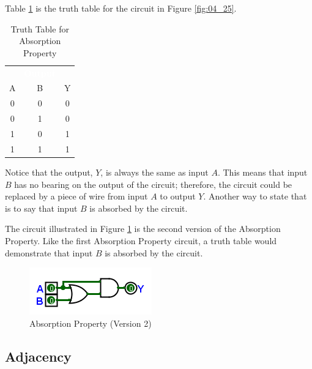 Table \ref{BF:tab:truth_table_for_absorption_property_version_1} is the truth table for the circuit in Figure \ref{fig:04_25}.

\begin{table}[H]
  \sffamily
  \newcommand{\head}[1]{\textcolor{white}{\textbf{#1}}}    
  \begin{center}
    \begin{tabular}{ccc} 
      \rowcolor{black!75}
      \multicolumn{2}{c}{\head{Inputs}} & \head{Output} \\
      A & B & Y \\
      \hline
      0 & 0 & 0 \\
      0 & 1 & 0 \\
      1 & 0 & 1 \\
      1 & 1 & 1 
    \end{tabular}
  \end{center}
  \caption{Truth Table for Absorption Property}
  \label{BF:tab:truth_table_for_absorption_property_version_1}
\end{table}

Notice that the output, $ Y $, is always the same as input $ A $. This means that input $ B $ has no bearing on the output of the circuit; therefore, the circuit could be replaced by a piece of wire from input $ A $ to output $ Y $. Another way to state that is to say that input $ B $ is absorbed by the circuit.

The circuit illustrated in Figure \ref{fig:04_26} is the second version of the Absorption Property. Like the first Absorption Property circuit, a truth table would demonstrate that input $ B $ is absorbed by the circuit. 

\begin{figure}[H]
	\centering
	\includegraphics[width=\maxwidth{.95\linewidth}]{gfx/04_26}
	\caption{Absorption Property (Version 2)}
	\label{fig:04_26}
\end{figure}

\subsection{Adjacency}
\label{BF:subsec:adjacency_property}

